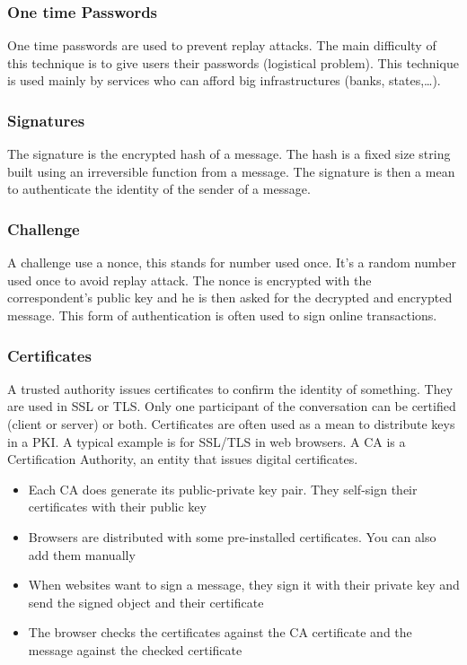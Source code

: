 \subsubsection{One time Passwords}
One time passwords are used to prevent replay attacks.
The main difficulty of this technique is to give users their passwords
(logistical problem).
This technique is used mainly by services who can afford big infrastructures
(banks, states,\ldots).

\subsubsection{Signatures}
The signature is the encrypted hash of a message.
The hash is a fixed size string built using an irreversible function from a
message.
The signature is then a mean to authenticate the identity of the sender of a
message.

\subsubsection{Challenge}
A challenge use a nonce, this stands for number used once.
It's a random number used once to avoid replay attack.
The nonce is encrypted with the correspondent's public key and he is then
asked for the decrypted and encrypted message.
This form of authentication is often used to sign online transactions.

\subsubsection{Certificates}
A trusted authority issues certificates to confirm the identity of something.
They are used in SSL or TLS.
Only one participant of the conversation can be certified (client or server)
or both.
Certificates are often used as a mean to distribute keys in a PKI. A typical
example is for SSL/TLS in web browsers. A CA is a Certification Authority, an
entity that issues digital certificates.
\begin{itemize}
\item Each CA does generate its public-private key pair. They self-sign their
certificates with their public key
\item Browsers are distributed with some pre-installed certificates. You can
also add them manually
\item When websites want to sign a message, they sign it with their private
key and send the signed object and their certificate
\item The browser checks the certificates against the CA certificate and the
message against the checked certificate
\end{itemize}

